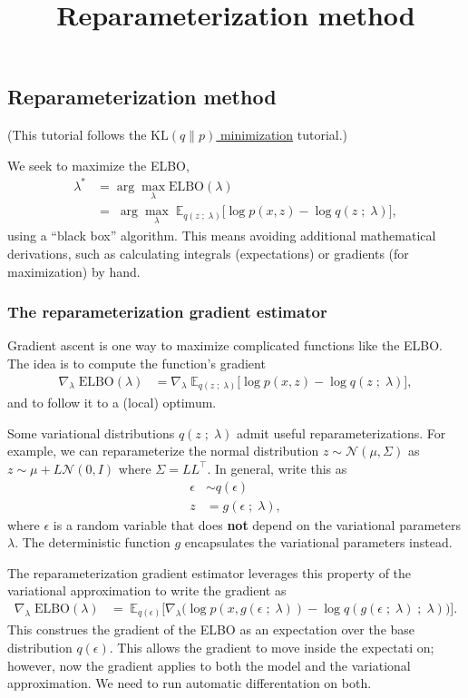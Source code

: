 \title{Reparameterization method}

\subsection{Reparameterization method}

(This tutorial follows the
\href{tut_KLqp.html}{$\text{KL}(q\|p)$ minimization} tutorial.)

We seek to maximize the ELBO,
\begin{align*}
  \lambda^*
  &=
  \arg \max_\lambda \text{ELBO}(\lambda)\\
  &=\;
  \arg \max_\lambda\;
  \mathbb{E}_{q(z\;;\;\lambda)}
  \big[
  \log p(x, z)
  -
  \log q(z\;;\;\lambda)
  \big],
\end{align*}
using a ``black box'' algorithm. This means avoiding additional
mathematical derivations, such as calculating integrals (expectations) or
gradients (for maximization) by hand.

\subsubsection{The reparameterization gradient estimator}

Gradient ascent is one way to maximize complicated functions like the ELBO. The
idea is to compute the function's gradient
\begin{align*}
  \nabla_\lambda\;
  \text{ELBO}(\lambda)
  &=
  \nabla_\lambda\;
  \mathbb{E}_{q(z\;;\;\lambda)}
  \big[
  \log p(x, z)
  -
  \log q(z\;;\;\lambda)
  \big],
\end{align*}
and to follow it to a (local) optimum.

Some variational distributions $q(z\;;\;\lambda)$ admit useful
reparameterizations. For example, we can reparameterize the normal distribution 
$z \sim \mathcal{N}(\mu, \Sigma)$ as 
$z \sim \mu + L \mathcal{N}(0, I)$ where $\Sigma = LL^\top$. In general, write
this as
\begin{align*}
  \epsilon &\sim q(\epsilon)\\
  z &= g(\epsilon \;;\; \lambda),
\end{align*}
where $\epsilon$ is a random variable that does \textbf{not} depend on the
variational parameters $\lambda$. The deterministic function $g$ encapsulates
the variational parameters instead.

The reparameterization gradient estimator leverages this property of the
variational approximation to write the gradient as
\begin{align*}
  \nabla_\lambda\;
  \text{ELBO}(\lambda)
  &=\; 
  \mathbb{E}_{q(\epsilon)}
  \big[
  \nabla_\lambda
  \big(
  \log p(x, g(\epsilon \;;\; \lambda))
  -
  \log q(g(\epsilon \;;\; \lambda) \;;\;\lambda)
  \big)
  \big].
\end{align*}
This construes the gradient of the ELBO as an expectation over the base
distribution $q(\epsilon)$. This allows the gradient to move inside the
expectati on; however, now the gradient applies to both the model and the
variational approximation. We need to run automatic differentation on both.


